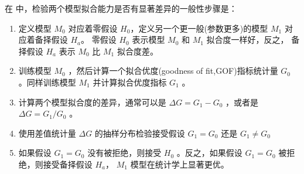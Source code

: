 \documentclass[letterpaper,10pt,english]{sphinxmanual}
\begin{document}
在  中，检验两个模型拟合能力是否有显著差异的一般性步骤是：
\begin{enumerate}
%
\item {} 
定义模型 \(M_0\) 对应着零假设 \(H_0\)，定义另一个更一般(参数更多)的模型 \(M_1\) 对应着备择假设 \(H_a\)。
零假设 \(H_0\) 表示模型 \(M_0\) 和 \(M_1\) 拟合度一样好，反之，
备择假设 \(H_a\) 表示  \(M_0\) 比  \(M_1\) 拟合度差。

\item {} 
训练模型 \(M_0\) ，然后计算一个拟合优度(goodness of fit,GOF)指标统计量 \(G_0\) 。同样训练模型 \(M_1\) 并计算拟合优度指标 \(G_1\) 。

\item {} 
计算两个模型拟合度的差异，通常可以是 \(\Delta G=G_1-G_0\) ，或者是 \(\Delta G=G_1/G_0\) 。

\item {} 
使用差值统计量 \(\Delta G\) 的抽样分布检验接受假设 \(G_1=G_0\) 还是 \(G_1 \ne G_0\)

\item {} 
如果假设 \(G_1=G_0\) 没有被拒绝，则接受 \(H_0\) 。反之，如果假设 \(G_1=G_0\) 被拒绝，则接受备择假设 \(H_a\)，
\(M_1\) 模型在统计学上显著更优。

\end{enumerate}
\end{document}
